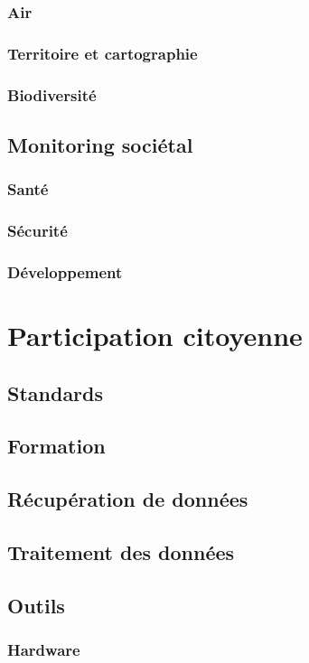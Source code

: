 \documentclass[10pt, conference, compsocconf]{llncs}
\begin{document}
\subsubsection{Air}
\subsubsection{Territoire et cartographie}
\subsubsection{Biodiversité}

\subsection{Monitoring sociétal}
\subsubsection{Santé}
\subsubsection{Sécurité}
\subsubsection{Développement}

\section{Participation citoyenne}
\subsection{Standards}
\subsection{Formation}
\subsection{Récupération de données}
\subsection{Traitement des données}
\subsection{Outils}
\subsubsection{Hardware}
\end{document}
